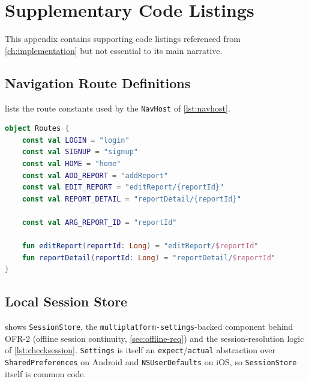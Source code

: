 \chapter{Supplementary Code Listings}
\label{app:code}

This appendix contains supporting code listings referenced from
\cref{ch:implementation} but not essential to its main narrative.

\section{Navigation Route Definitions}

 lists the route constants used by the
\texttt{NavHost} of \cref{lst:navhost}.

\begin{lstlisting}[language=Kotlin, caption={\texttt{ui/navigation/Routes.kt}.}, label={lst:app-routes}]
object Routes {
    const val LOGIN = "login"
    const val SIGNUP = "signup"
    const val HOME = "home"
    const val ADD_REPORT = "addReport"
    const val EDIT_REPORT = "editReport/{reportId}"
    const val REPORT_DETAIL = "reportDetail/{reportId}"

    const val ARG_REPORT_ID = "reportId"

    fun editReport(reportId: Long) = "editReport/$reportId"
    fun reportDetail(reportId: Long) = "reportDetail/$reportId"
}
\end{lstlisting}

\section{Local Session Store}

 shows \texttt{SessionStore}, the
\texttt{multiplatform-settings}-backed component behind OFR-2 (offline
session continuity, \cref{sec:offline-req}) and the session-resolution
logic of \cref{lst:checksession}. \texttt{Settings} is itself an
\texttt{expect}/\texttt{actual} abstraction over \texttt{SharedPreferences}
on Android and \texttt{NSUserDefaults} on iOS, so \texttt{SessionStore}
itself is common code.

